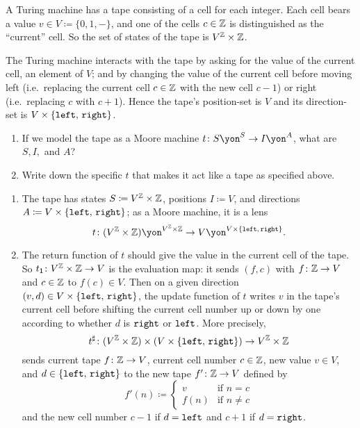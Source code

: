 \documentclass[Book-Poly]{subfiles}
\begin{document}
\begin{exercise}
A Turing machine has a tape consisting of a cell for each integer.
Each cell bears a value $v\in V\coloneqq\{0,1,-\}$, and one of the cells $c\in\mathbb{Z}$ is distinguished as the ``current'' cell.
So the set of states of the tape is $V^{\mathbb{Z}}\times\mathbb{Z}$.

The Turing machine interacts with the tape by asking for the value of the current cell, an element of $V$; and by changing the value of the current cell before moving left (i.e.\ replacing the current cell $c\in\mathbb{Z}$ with the new cell $c-1$) or right (i.e.\ replacing $c$ with $c+1$).
Hence the tape's position-set is $V$ and its direction-set is $V\times\{\texttt{left},\,\texttt{right}\}$.

\begin{enumerate}
	\item If we model the tape as a Moore machine $t\colon S\yon^S\to I\yon^A$, what are $S,I,$ and $A$?
	\item Write down the specific $t$ that makes it act like a tape as specified above.
\qedhere
\end{enumerate}
\begin{solution}
\begin{enumerate}
    \item The tape has states $S\coloneqq V^{\mathbb{Z}} \times \mathbb{Z}$, positions $I\coloneqq V$, and directions $A\coloneqq V\times\{\texttt{left},\,\texttt{right}\}$; as a Moore machine, it is a lens
    \[
        t \colon (V^\zz \times \zz)\yon^{V^\zz \times \zz} \to V\yon^{V \times \{\const{left},\,\const{right}\}}.
    \]
    \item The return function of $t$ should give the value in the current cell of the tape.
    So $t_{\textsf{1}}\colon V^{\mathbb{Z}}\times\mathbb{Z}\to V$ is the evaluation map: it sends $(f,c)$ with $f\colon\mathbb{Z}\to V$ and $c\in\mathbb{Z}$ to $f(c)\in V$.
    Then on a given direction $(v,d)\in V\times\{\texttt{left},\,\texttt{right}\}$, the update function of $t$ writes $v$ in the tape's current cell before shifting the current cell number up or down by one according to whether $d$ is $\texttt{right}$ or $\texttt{left}$.
    More precisely,
    \[
        t^\sharp \colon (V^{\mathbb{Z}} \times \mathbb{Z}) \times (V \times \{\texttt{left},\,\texttt{right}\}) \to V^{\mathbb{Z}} \times \mathbb{Z}
    \]
    sends current tape $f\colon\mathbb{Z}\to V$, current cell number $c\in\mathbb{Z}$, new value $v \in V$, and $d \in \{\texttt{left},\,\texttt{right}\}$ to the new tape $f' \colon \mathbb{Z} \to V$ defined by
    \[
        f'(n)\coloneqq
        \begin{cases}
            v & \text{if } n = c \\
            f(n) & \text{if } n \neq c
        \end{cases}
    \]
    and the new cell number $c-1$ if $d=\texttt{left}$ and $c+1$ if $d=\texttt{right}$.
\end{enumerate}
\end{solution}
\end{exercise}
\end{document}
